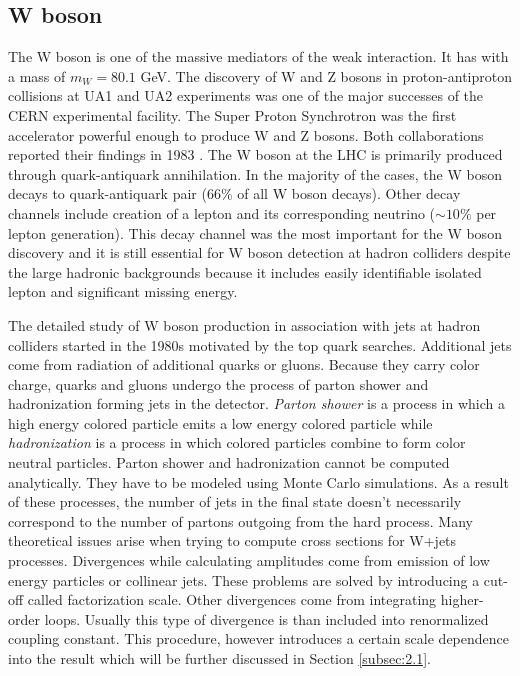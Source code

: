 
\subsection{W boson}

The W boson is one of the massive mediators of the weak interaction. It has with a mass of $m_W=80.1$ GeV.
The discovery of W and Z bosons in proton-antiproton collisions at UA1 and UA2 experiments was one of the major successes of the CERN experimental facility. The Super Proton Synchrotron was the first accelerator powerful enough to produce W and Z bosons. Both collaborations reported their findings in 1983 \cite{Arnison:1983rp,Banner:1983jy}.
The W boson at the LHC is primarily produced through quark-antiquark annihilation. In the majority of the cases, the W boson decays to quark-antiquark pair ($66\%$ of all W boson decays). Other decay channels include creation of a lepton and its corresponding neutrino ($\sim 10\%$ per lepton generation). This decay channel was the most important for the W boson discovery and it is still essential for W boson detection at hadron colliders despite the large hadronic backgrounds because it includes easily identifiable isolated lepton and significant missing energy. 
\par The detailed study of W boson production in association with jets at hadron colliders started in the 1980s motivated by the top quark searches. Additional jets come from radiation of additional quarks or gluons. Because they carry color charge, quarks and gluons undergo the process of parton shower and hadronization forming jets in the detector. \textit{Parton shower} is a process in which a high energy colored particle emits a low energy colored particle while \textit{hadronization} is a process in which colored particles combine to form color neutral particles. Parton shower and hadronization cannot be computed analytically. They have to be modeled using Monte Carlo simulations. As a result of these processes, the number of jets in the final state doesn't necessarily correspond to the number of partons outgoing from the hard process. Many theoretical issues arise when trying to compute cross sections for W+jets processes. Divergences while calculating amplitudes come from emission of low energy particles or collinear jets. These problems are solved by introducing a cut-off called factorization scale. Other divergences come from integrating higher-order loops. Usually this type of divergence is than included into renormalized coupling constant. This procedure, however introduces a certain scale dependence into the result which will be further discussed in Section \ref{subsec:2.1}. 


